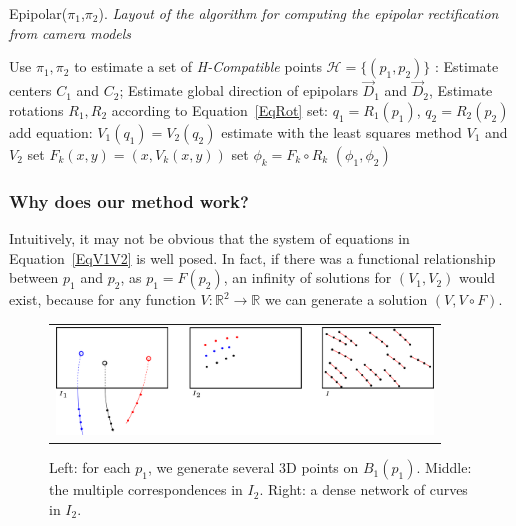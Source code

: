 \documentclass{ipol}
\newcommand{\RR}{\ensuremath{\mathbb{R}}}
\begin{document}
\begin{algorithm}[H]
\caption{Epipolar($\pi_1$,$\pi_2$). \emph{Layout of the algorithm for computing the epipolar rectification from camera models}}
\begin{algorithmic}
    \STATE Use $\pi_1,\pi_2$ to estimate a set of \emph{H-Compatible} points $\mathcal{H} =\{(p_1,p_2)\}$ : 
    \STATE Estimate centers $C_1$ and $C_2$;
    \STATE Estimate global direction of epipolars $\vec{D}_1$ and $\vec{D}_2$,
    \STATE Estimate rotations $R_1,R_2$ according to Equation~\eqref{EqRot}
              \STATE set: $q_1 = R_1(p_1)$,  $q_2 = R_2(p_2)$
              \STATE add equation: $V_1(q_1) = V_2(q_2)$
    \ENDFOR
    \STATE estimate with the least squares method $V_1$ and $V_2$
    \STATE set $F_k(x,y)=(x,V_k(x,y))$  %
    \STATE set $\phi_k =  F_k \circ  R_k $ %
    \RETURN $(\phi_1,\phi_2)$
\end{algorithmic}
\label{AlgoGlob}
\end{algorithm}



\subsubsection{Why does our method work?}
\label{WhyWork}

Intuitively, it may not be  obvious that the system of equations in Equation~\eqref{EqV1V2} is well posed.
In fact, if there was a functional relationship between
$p_1$ and $p_2$, as $p_1=F(p_2)$,  an infinity of solutions
for $(V_1,V_2)$ would exist, because   for any function $V: \RR^2 \rightarrow \RR $ we can generate a solution $(V,V\circ F)$.

\begin{figure}
\centering
\begin{tabular}{c}
\includegraphics[width=10cm]{FIGS/NonFuncCorresp.png}
\end{tabular}
\caption{Left: for each $p_1$, we generate several $3$D points on $B_1(p_1)$. Middle:
         the multiple correspondences in $I_2$. Right: a dense network of curves in $I_2$.}
 
\label{NonFuncCorresp}
\end{figure}
\end{document}
